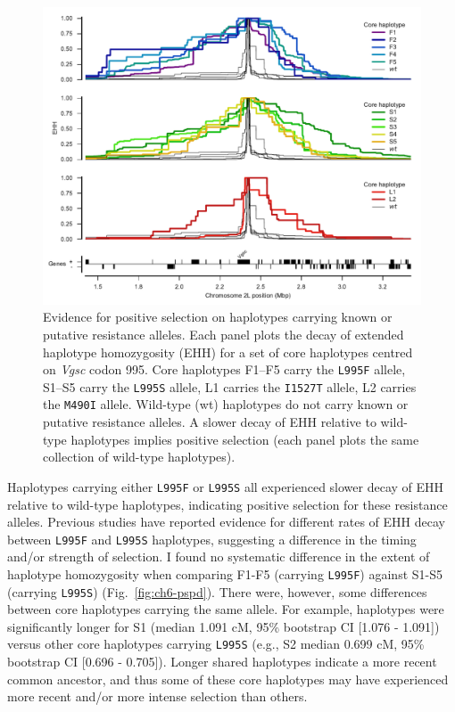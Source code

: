\begin{refsection}
\begin{figure}[t!]
\centering
\includegraphics[width=1\linewidth,center]{artwork/chapter6/ehh.pdf}
\caption{Evidence for positive selection on haplotypes carrying known or putative resistance alleles.
%
Each panel plots the decay of extended haplotype homozygosity (EHH) for a set of core haplotypes centred on \textit{Vgsc} codon 995.
%
Core haplotypes F1--F5 carry the \texttt{L995F} allele, S1--S5 carry the \texttt{L995S} allele, L1 carries the \texttt{I1527T} allele, L2 carries the \texttt{M490I} allele.
%
Wild-type (wt) haplotypes do not carry known or putative resistance alleles.
%
A slower decay of EHH relative to wild-type haplotypes implies positive selection (each panel plots the same collection of wild-type haplotypes).
}
\label{fig:ch6-ehh}
\end{figure}


Haplotypes carrying either \texttt{L995F} or \texttt{L995S} all experienced slower decay of EHH relative to wild-type haplotypes, indicating positive selection for these resistance alleles.
%
Previous studies have reported evidence for different rates of EHH decay between \texttt{L995F} and \texttt{L995S} haplotypes, suggesting a difference in the timing and/or strength of selection.
%
I found no systematic difference in the extent of haplotype homozygosity when comparing F1-F5 (carrying \texttt{L995F}) against S1-S5 (carrying \texttt{L995S}) (Fig.~\ref{fig:ch6-pspd}).
%
There were, however, some differences between core haplotypes carrying the same allele.
%
For example, haplotypes were significantly longer for S1 (median 1.091 cM, 95\% bootstrap CI [1.076 - 1.091]) versus other core haplotypes carrying \texttt{L995S} (e.g., S2 median 0.699 cM, 95\% bootstrap CI [0.696 - 0.705]).
%
Longer shared haplotypes indicate a more recent common ancestor, and thus some of these core haplotypes may have experienced more recent and/or more intense selection than others.



\end{refsection}

